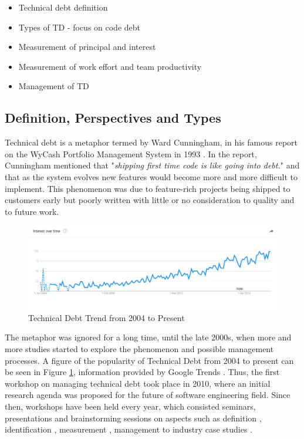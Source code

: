 \documentclass{mprop}
\begin{document}
\begin{itemize}
	\item Technical debt definition
	\item Types of TD - focus on code debt
	\item Measurement of principal and interest
	\item Measurement of work effort and team productivity
	\item Management of TD
\end{itemize}

\subsection{Definition, Perspectives and Types}

Technical debt is a metaphor termed by Ward Cunningham, in his famous report on
the WyCash Portfolio Management System in 1993 \cite{Cunningham1993}. In the
report, Cunningham mentioned that "\textit{shipping first time code is like
going into debt.}" and that as the system evolves new features would become more
and more difficult to implement. This phenomenon was due to feature-rich
projects being shipped to customers early but poorly written with little or no
consideration to quality and to future work.

\begin{figure}
	\centering
	\includegraphics[width=\linewidth]{visualisations/TD_trend.png}
	\caption{Technical Debt Trend from 2004 to Present}
	\label{fig:td-trend}
\end{figure}

The metaphor was ignored for a long time, until the late 2000s, when more and
more studies started to explore the phenomenon and possible management
processes. A figure of the popularity of Technical Debt from 2004 to present can
be seen in Figure \ref{fig:td-trend}, information provided by Google Trends
\cite{GoogleTrends}. Thus, the first workshop on managing technical debt took
place in 2010, where an initial research agenda was proposed for the future of
software engineering field. Since then, workshops have been held every year,
which consisted seminars, presentations and brainstorming sessions on aspects
such as definition \cite{Kruchten2012} \cite{Theodoropoulos2011}
\cite{Schmid2013}, identification \cite{Ernst2012}, measurement
\cite{Letouzey2012} \cite{Curtis2012} \cite{Nugroho2011} \cite{Zazworka2011}
\cite{Fontana2012} \cite{Bohnet2011}, management \cite{Guo2011}
\cite{Zazworka2011Prioritise} \cite{Seaman2012} to industry case studies
\cite{Lim2012} \cite{Morgenthaler2012} \cite{Codabux2013} \cite{Holvitie2014}
\cite{Klinger2011}.
\end{document}

